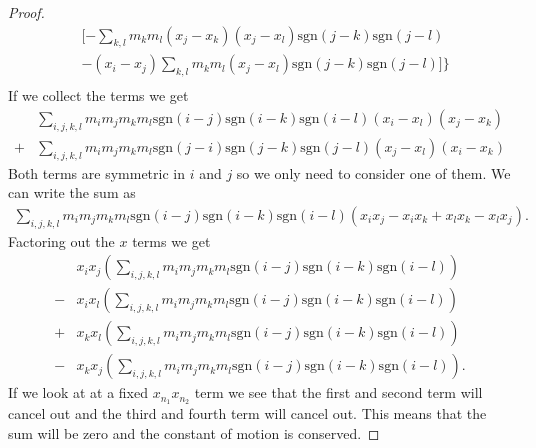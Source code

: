 \documentclass[english,master]{liumaiex}
\theoremstyle{plain}
\theoremstyle{definition}
\newcommand{\sgn}{\text{sgn}}
\begin{document}
\begin{proof}
\begin{equation}
\begin{aligned}
			&[-\sum_{k,l} m_k m_l (x_j - x_k) (x_j - x_l) \sgn(j - k) \sgn(j - l)\\
			&-(x_i - x_j)\sum_{k,l} m_k m_l (x_j - x_l) \sgn(j - k) \sgn(j - l)]\}\\
	\end{aligned}
	\end{equation}
	If we collect the terms we get
	\begin{align}
		&\sum_{i,j,k,l} m_i m_j m_k m_l \sgn(i - j) \sgn(i - k) \sgn(i - l) (x_i - x_l) (x_j - x_k)\\ 
		+&\sum_{i,j,k,l} m_i m_j m_k m_l \sgn(j - i) \sgn(j - k) \sgn(j - l) (x_j - x_l) (x_i - x_k) 
	\end{align}
	Both terms are symmetric in $i$ and $j$ so we only need to consider one of them. We can write the sum as
	\begin{align}
		\sum_{i,j,k,l} m_i m_j m_k m_l \sgn(i - j) \sgn(i - k) \sgn(i - l) (x_i x_j - x_i x_k + x_l x_k - x_l x_j).
	\end{align}
	Factoring out the $x$ terms we get
	\begin{align}
		&x_i x_j (\sum_{i,j,k,l} m_i m_j m_k m_l \sgn(i - j) \sgn(i - k) \sgn(i - l))\\
		- &x_i x_l (\sum_{i,j,k,l} m_i m_j m_k m_l \sgn(i - j) \sgn(i - k) \sgn(i - l))\\
		+ &x_k x_l (\sum_{i,j,k,l} m_i m_j m_k m_l \sgn(i - j) \sgn(i - k) \sgn(i - l))\\
		- &x_k x_j (\sum_{i,j,k,l} m_i m_j m_k m_l \sgn(i - j) \sgn(i - k) \sgn(i - l)).
	\end{align}
	If we look at at a fixed $x_{n_1}x_{n_2}$ term we see that the first and second term will cancel out and the third and fourth term will cancel out. This means that the sum will be zero and the constant of motion is conserved.
\end{proof}
\end{document}
